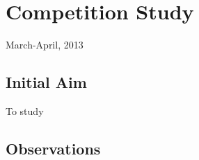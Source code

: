 \chapter{Competition Study}
\begin{flushright}
March-April, 2013
\end{flushright}
\section{Initial Aim}
	To study 
\section{Observations}	

